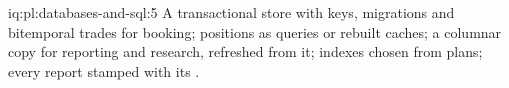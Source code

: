 \begin{solution}{iq:pl:databases-and-sql:5}
A transactional store with keys, migrations and bitemporal trades for booking; positions as queries or rebuilt caches; a columnar copy for
reporting and research, refreshed from it; indexes chosen from plans; every report stamped with its .
\end{solution}
